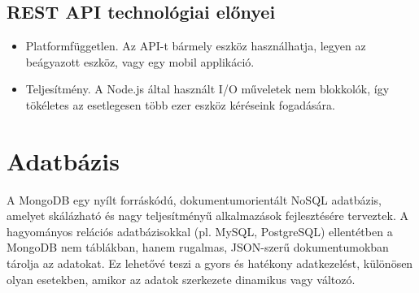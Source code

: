 \documentclass{thesis-ekf}
\theoremstyle{definition}
\theoremstyle{remark}
\begin{document}
	\subsection{REST API technológiai előnyei} 
		\begin{itemize}
			\item Platformfüggetlen. Az API-t bármely eszköz használhatja, legyen az beágyazott eszköz, vagy egy mobil applikáció.
			\item Teljesítmény. A Node.js által használt I/O műveletek nem blokkolók, így tökéletes az esetlegesen több ezer eszköz kéréseink fogadására.
		\end{itemize}
	
	
	\section{Adatbázis}
	A MongoDB egy nyílt forráskódú, dokumentumorientált NoSQL adatbázis, amelyet skálázható és nagy teljesítményű alkalmazások fejlesztésére terveztek. A hagyományos relációs adatbázisokkal (pl. MySQL, PostgreSQL) ellentétben a MongoDB nem táblákban, hanem rugalmas, JSON-szerű dokumentumokban tárolja az adatokat. Ez lehetővé teszi a gyors és hatékony adatkezelést, különösen olyan esetekben, amikor az adatok szerkezete dinamikus vagy változó.
	
\end{document}

